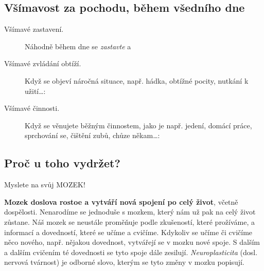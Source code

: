 	\subsection{Všímavost za pochodu, během všedního dne}
		\begin{description}
			\item[ Všímavé zastavení.] Náhodně během dne se \emph{zastavte} a 
			\item[ Všímavé zvládání obtíží.]
				Když se objeví náročná situace, např. hádka, obtížné pocity, nutkání k užití…:
			\item[ Všímavé činnosti.]
				Když se věnujete běžným činnostem, jako je např. jedení, domácí práce, sprchování se, čištění zubů, chůze někam…:
		\end{description}
		\vfill

	\pageSOBER
	\pagePracticeLog

	\clearpage
	\subsection{Proč u toho vydržet?}

		 Myslete na svůj MOZEK! 

		\textbf{Mozek doslova rostoe a vytváří nová spojení po celý život}, včetně dospělosti. Nenarodíme se jednoduše s mozkem, který nám už pak na celý život zůstane. Náš mozek se neustále proměňuje podle zkušeností, které prožíváme, a informací a dovedností, které se učíme a cvičíme. Kdykoliv se učíme či cvičíme něco nového, např. nějakou dovednost, vytvářejí se v mozku nové spoje. S dalším a dalším cvičením té dovednosti se tyto spoje dále zesilují. \emph{Neuroplasticita} (dosl. nervová tvárnost) je odborné slovo, kterým se tyto změny v mozku popisují.

